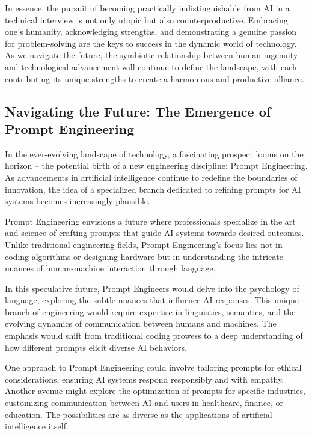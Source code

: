 \documentclass[
    a4paper, %
    10pt, %
    unnumberedsections, %
    twoside, %
]{LTJournalArticle}
\begin{document}
In essence, the pursuit of becoming practically indistinguishable from AI in a technical interview is not only utopic but also counterproductive. Embracing one's humanity, acknowledging strengths, and demonstrating a genuine passion for problem-solving are the keys to success in the dynamic world of technology. As we navigate the future, the symbiotic relationship between human ingenuity and technological advancement will continue to define the landscape, with each contributing its unique strengths to create a harmonious and productive alliance.



\subsection{Navigating the Future: The Emergence of Prompt Engineering}

In the ever-evolving landscape of technology, a fascinating prospect looms on the horizon – the potential birth of a new engineering discipline: Prompt Engineering. As advancements in artificial intelligence continue to redefine the boundaries of innovation, the idea of a specialized branch dedicated to refining prompts for AI systems becomes increasingly plausible.

Prompt Engineering envisions a future where professionals specialize in the art and science of crafting prompts that guide AI systems towards desired outcomes. Unlike traditional engineering fields, Prompt Engineering's focus lies not in coding algorithms or designing hardware but in understanding the intricate nuances of human-machine interaction through language.

In this speculative future, Prompt Engineers would delve into the psychology of language, exploring the subtle nuances that influence AI responses. This unique branch of engineering would require expertise in linguistics, semantics, and the evolving dynamics of communication between humans and machines. The emphasis would shift from traditional coding prowess to a deep understanding of how different prompts elicit diverse AI behaviors.

One approach to Prompt Engineering could involve tailoring prompts for ethical considerations, ensuring AI systems respond responsibly and with empathy. Another avenue might explore the optimization of prompts for specific industries, customizing communication between AI and users in healthcare, finance, or education. The possibilities are as diverse as the applications of artificial intelligence itself.
\end{document}
